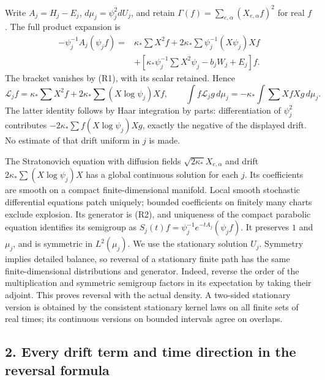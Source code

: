 \documentclass[11pt]{article}
\begin{document}
Write \(A_j=H_j-E_j\), \(d\mu_j=\psi_j^2dU_j\), and retain
\(\Gamma(f)=\sum_{e,\alpha}(X_{e,\alpha}f)^2\) for real \(f\).
The full product expansion is
\[
\begin{aligned}
-\psi_j^{-1}A_j(\psi_j f)
={}&\kappa_*\sum X^2f+
  2\kappa_*\sum\psi_j^{-1}(X\psi_j)Xf\\
 &+\left[\kappa_*\psi_j^{-1}\sum X^2\psi_j
            -b_jW_j+E_j\right]f.
\end{aligned}
\]
The bracket vanishes by (R1), with its scalar retained. Hence
\[
 \mathcal L_jf=\kappa_*\sum X^2f+
      2\kappa_*\sum(X\log\psi_j)Xf,\qquad
 \int f\mathcal L_jg\,d\mu_j=-\kappa_*\int\sum XfXg\,d\mu_j.
 \tag{R2}
\]
The latter identity follows by Haar integration by parts: differentiation
of \(\psi_j^2\) contributes
\(-2\kappa_*\sum f(X\log\psi_j)Xg\), exactly the negative of
the displayed drift. No estimate of that drift uniform in \(j\) is made.

The Stratonovich equation with diffusion fields
\(\sqrt{2\kappa_*}X_{e,\alpha}\) and drift
\(2\kappa_*\sum(X\log\psi_j)X\) has a global continuous solution for
each \(j\). Its coefficients are smooth on a compact finite-dimensional
manifold. Local smooth stochastic differential equations patch uniquely;
bounded coefficients on finitely many charts exclude explosion. Its
generator is (R2), and uniqueness of the compact parabolic equation
identifies its semigroup as
\(S_j(t)f=\psi_j^{-1}e^{-tA_j}(\psi_j f)\).
It preserves \(1\) and \(\mu_j\), and is symmetric in \(L^2(\mu_j)\).
We use the stationary solution \(U_j\). Symmetry implies detailed
balance, so reversal of a stationary finite path has the same
finite-dimensional distributions and generator. Indeed, reverse the
order of the multiplication and symmetric semigroup factors in its
expectation by taking their adjoint. This proves reversal with the
actual density. A two-sided stationary version is obtained by the
consistent stationary kernel laws on all finite sets of real times;
its continuous versions on bounded intervals agree on overlaps.

\subsection*{2. Every drift term and time direction in the reversal formula}
\end{document}
